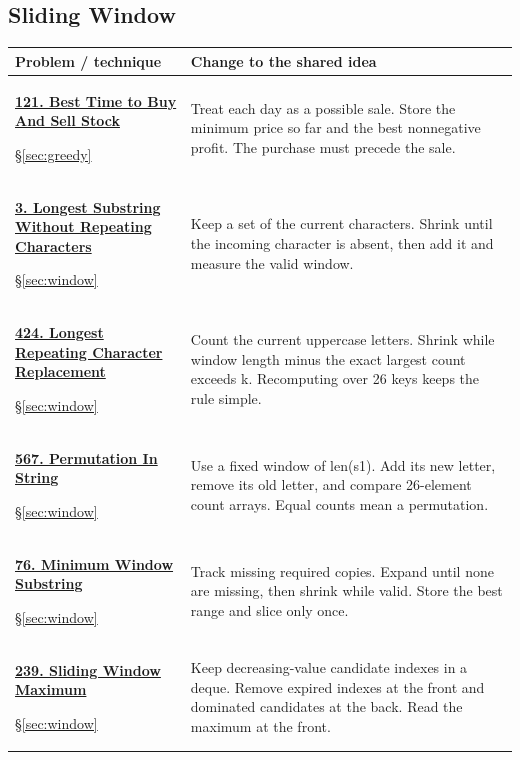 \documentclass[11pt]{article}
\newcommand{\sect}[1]{\hyperref[sec:#1]{\S\ref*{sec:#1}}}
\begin{document}
\subsection{Sliding Window}
\begin{longtable}{@{}L{4.3cm}L{11.7cm}@{}}
\toprule Problem / technique & Change to the shared idea \\ \midrule\endhead
\hypertarget{lc121}{}\href{https://leetcode.com/problems/best-time-to-buy-and-sell-stock/}{\textbf{121. Best Time to Buy And Sell Stock}}\par\sect{greedy} & Treat each day as a possible sale. Store the minimum price so far and the best nonnegative profit. The purchase must precede the sale.\\[4pt]
\hypertarget{lc3}{}\href{https://leetcode.com/problems/longest-substring-without-repeating-characters/}{\textbf{3. Longest Substring Without Repeating Characters}}\par\sect{window} & Keep a set of the current characters. Shrink until the incoming character is absent, then add it and measure the valid window.\\[4pt]
\hypertarget{lc424}{}\href{https://leetcode.com/problems/longest-repeating-character-replacement/}{\textbf{424. Longest Repeating Character Replacement}}\par\sect{window} & Count the current uppercase letters. Shrink while window length minus the exact largest count exceeds k. Recomputing over 26 keys keeps the rule simple.\\[4pt]
\hypertarget{lc567}{}\href{https://leetcode.com/problems/permutation-in-string/}{\textbf{567. Permutation In String}}\par\sect{window} & Use a fixed window of len(s1). Add its new letter, remove its old letter, and compare 26-element count arrays. Equal counts mean a permutation.\\[4pt]
\hypertarget{lc76}{}\href{https://leetcode.com/problems/minimum-window-substring/}{\textbf{76. Minimum Window Substring}}\par\sect{window} & Track missing required copies. Expand until none are missing, then shrink while valid. Store the best range and slice only once.\\[4pt]
\hypertarget{lc239}{}\href{https://leetcode.com/problems/sliding-window-maximum/}{\textbf{239. Sliding Window Maximum}}\par\sect{window} & Keep decreasing-value candidate indexes in a deque. Remove expired indexes at the front and dominated candidates at the back. Read the maximum at the front.\\[4pt]
\bottomrule
\end{longtable}
\end{document}
